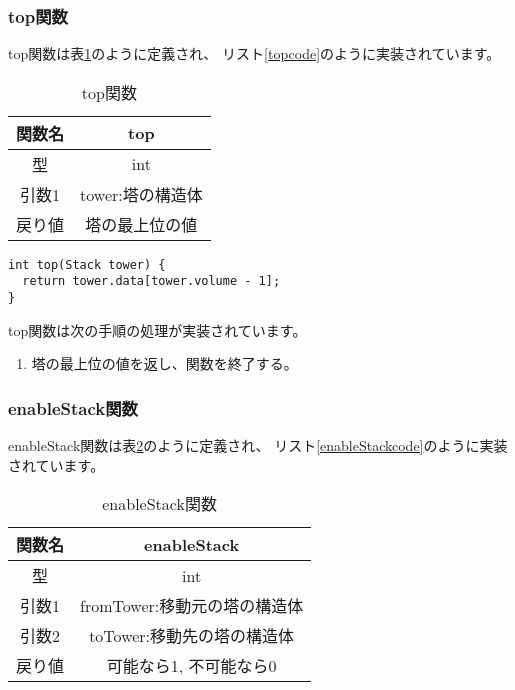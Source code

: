 \documentclass[a4j]{jarticle}
\begin{document}
\subsubsection{top関数}
top関数は表\ref{tb:top}のように定義され、
リスト\ref{topcode}のように実装されています。

\begin{table}[h]
  \centering
  \caption{top関数}
  \label{tb:top}
  \begin{tabular}{|c|c|}
    \hline
    関数名 & top         \\
    \hline
    型   & int         \\
    \hline
    引数1 & tower:塔の構造体 \\
    \hline
    戻り値 & 塔の最上位の値     \\
    \hline
  \end{tabular}
\end{table}


\begin{lstlisting}[caption=top関数,label=topcode]
int top(Stack tower) {
  return tower.data[tower.volume - 1];
}
\end{lstlisting}

top関数は次の手順の処理が実装されています。
\begin{enumerate}
  \item 塔の最上位の値を返し、関数を終了する。
\end{enumerate}

\subsubsection{enableStack関数}
\label{sec:enableStack}
enableStack関数は表\ref{tb:enableStack}のように定義され、
リスト\ref{enableStackcode}のように実装されています。

\begin{table}[h]
  \centering
  \caption{enableStack関数}
  \label{tb:enableStack}
  \begin{tabular}{|c|c|}
    \hline
    関数名 & enableStack         \\
    \hline
    型   & int                 \\
    \hline
    引数1 & fromTower:移動元の塔の構造体 \\
    \hline
    引数2 & toTower:移動先の塔の構造体   \\
    \hline
    戻り値 & 可能なら1, 不可能なら0       \\
    \hline
  \end{tabular}
\end{table}
\end{document}

